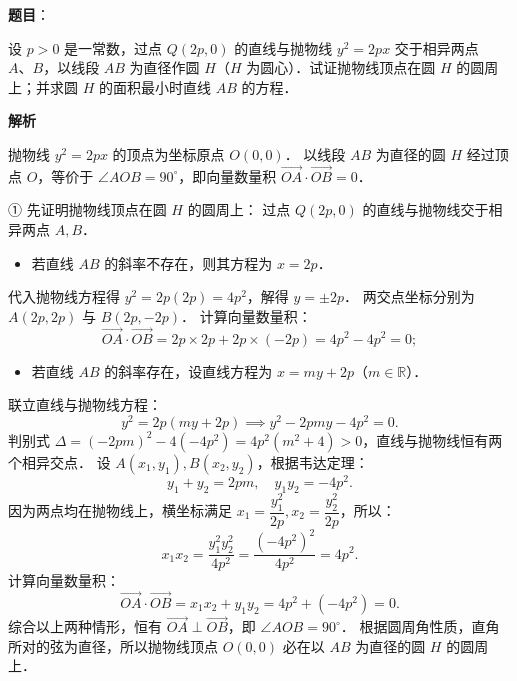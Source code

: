 \begin{answer}

\textbf{题目}：

设 $p > 0$ 是一常数，过点 $Q(2p, 0)$ 的直线与抛物线 $y^2 = 2px$ 交于相异两点 $A\text{、}B$，以线段 $AB$ 为直径作圆 $H$（$H$ 为圆心）．试证抛物线顶点在圆 $H$ 的圆周上；并求圆 $H$ 的面积最小时直线 $AB$ 的方程．

\textbf{解析}

抛物线 $y^2 = 2px$ 的顶点为坐标原点 $O(0, 0)$．
以线段 $AB$ 为直径的圆 $H$ 经过顶点 $O$，等价于 $\angle AOB = 90^\circ$，即向量数量积 $\overrightarrow{OA} \cdot \overrightarrow{OB} = 0$．

① 先证明抛物线顶点在圆 $H$ 的圆周上：
过点 $Q(2p, 0)$ 的直线与抛物线交于相异两点 $A, B$．
\begin{itemize}
\item 若直线 $AB$ 的斜率不存在，则其方程为 $x = 2p$．
\end{itemize}
  代入抛物线方程得 $y^2 = 2p(2p) = 4p^2$，解得 $y = \pm 2p$．
  两交点坐标分别为 $A(2p, 2p)$ 与 $B(2p, -2p)$．
  计算向量数量积：
\nopagebreak[4]
\[
\overrightarrow{OA} \cdot \overrightarrow{OB} = 2p \times 2p + 2p \times (-2p) = 4p^2 - 4p^2 = 0;
\]
\begin{itemize}
\item 若直线 $AB$ 的斜率存在，设直线方程为 $x = my + 2p$（$m \in \mathbb{R}$）．
\end{itemize}
  联立直线与抛物线方程：
\nopagebreak[4]
\[
y^2 = 2p(my + 2p) \implies y^2 - 2pmy - 4p^2 = 0.
\]
  判别式 $\Delta = (-2pm)^2 - 4(-4p^2) = 4p^2(m^2 + 4) > 0$，直线与抛物线恒有两个相异交点．
  设 $A(x_1, y_1), B(x_2, y_2)$，根据韦达定理：
\nopagebreak[4]
\[
y_1 + y_2 = 2pm, \quad y_1 y_2 = -4p^2.
\]
  因为两点均在抛物线上，横坐标满足 $x_1 = \dfrac{y_1^2}{2p}, x_2 = \dfrac{y_2^2}{2p}$，所以：
\nopagebreak[4]
\[
x_1 x_2 = \frac{y_1^2 y_2^2}{4p^2} = \frac{(-4p^2)^2}{4p^2} = 4p^2.
\]
  计算向量数量积：
\nopagebreak[4]
\[
\overrightarrow{OA} \cdot \overrightarrow{OB} = x_1 x_2 + y_1 y_2 = 4p^2 + (-4p^2) = 0.
\]
综合以上两种情形，恒有 $\overrightarrow{OA} \perp \overrightarrow{OB}$，即 $\angle AOB = 90^\circ$．
根据圆周角性质，直角所对的弦为直径，所以抛物线顶点 $O(0, 0)$ 必在以 $AB$ 为直径的圆 $H$ 的圆周上．


\end{answer}
